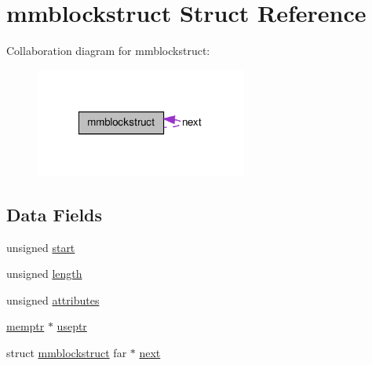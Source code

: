 \hypertarget{structmmblockstruct}{
\section{mmblockstruct Struct Reference}
\label{structmmblockstruct}
}


Collaboration diagram for mmblockstruct:
\nopagebreak
\begin{figure}[H]
\begin{center}
\leavevmode
\includegraphics[width=197pt]{structmmblockstruct__coll__graph}
\end{center}
\end{figure}
\subsection*{Data Fields}
\begin{DoxyCompactItemize}
\item 
unsigned \hyperlink{structmmblockstruct_afb20ac4ca3cc6f410876ad34f699f3a0}{start}
\item 
unsigned \hyperlink{structmmblockstruct_af24830b558d728e27b77b7ab3a0881d5}{length}
\item 
unsigned \hyperlink{structmmblockstruct_afa3e5ca318d4ec6bdebf0ad5f315077b}{attributes}
\item 
\hyperlink{ID__MM_8H_a04062decc7eb282b066c65e9137bb9bf}{memptr} $\ast$ \hyperlink{structmmblockstruct_acd45c42efd04e4b4d9a60ec3c200d5f0}{useptr}
\item 
struct \hyperlink{structmmblockstruct}{mmblockstruct} far $\ast$ \hyperlink{structmmblockstruct_afcfe2dec09baa09907163df789ef12d9}{next}
\end{DoxyCompactItemize}



